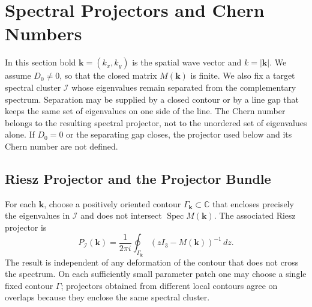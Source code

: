 \documentclass[11pt]{article}
\numberwithin{equation}{section}
\begin{document}
\section{Spectral Projectors and Chern Numbers}

In this section bold $\mathbf k=(k_x,k_y)$ is the spatial wave vector and
$k=|\mathbf k|$. We assume $D_0\ne0$, so that the closed matrix
$M(\mathbf k)$ is finite. We also fix a target spectral cluster
$\mathcal I$ whose eigenvalues remain separated from the complementary
spectrum. Separation may be supplied by a closed contour or by a line gap
that keeps the same set of eigenvalues on one side of the line. The Chern
number belongs to the resulting spectral projector, not to the unordered
set of eigenvalues alone. If $D_0=0$ or the separating gap closes, the
projector used below and its Chern number are not defined.

\subsection{Riesz Projector and the Projector Bundle}

For each $\mathbf k$, choose a positively oriented contour
$\Gamma_{\mathbf k}\subset\mathbb C$ that encloses precisely the
eigenvalues in $\mathcal I$ and does not intersect
$\operatorname{Spec}M(\mathbf k)$. The associated Riesz projector is
\begin{equation}
  P_{\mathcal I}(\mathbf k)=\frac{1}{2\pi i}
  \oint_{\Gamma_{\mathbf k}}
  (zI_3-M(\mathbf k))^{-1}\,dz .
  \label{eq:riesz_projection}
\end{equation}
The result is independent of any deformation of the contour that does not
cross the spectrum. On each sufficiently small parameter patch one may
choose a single fixed contour $\Gamma$; projectors obtained from different
local contours agree on overlaps because they enclose the same spectral
cluster.
\end{document}
